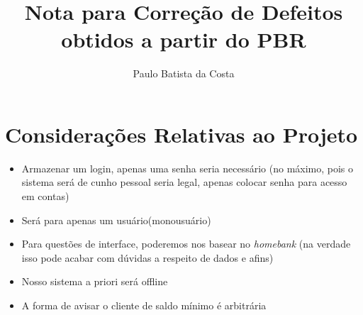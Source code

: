 \documentclass[11pt,a4paper,final]{report}
\author{Paulo Batista da Costa}
\title{Nota para Correção de Defeitos obtidos a partir do PBR}
\begin{document}
	\maketitle
	\section*{Considerações Relativas ao Projeto}
	\begin{itemize}
		\item Armazenar um login, apenas uma senha seria necessário (no máximo, pois o sistema será de cunho pessoal seria legal, apenas colocar
		senha para acesso em contas) 
		\item Será para apenas um usuário(monousuário)	
		\item Para questões de interface, poderemos nos basear no \textit{homebank} (na verdade isso pode acabar com dúvidas a respeito de dados e afins) 
		\item Nosso sistema a priori será offline 
		\item A forma de avisar o cliente de saldo mínimo é arbitrária
	\end{itemize}

	
\end{document}
